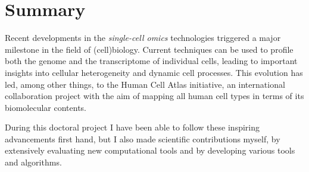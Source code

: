 
\newpage{\thispagestyle{empty}\cleardoublepage}

\newpage{\thispagestyle{empty}\cleardoublepage}
\tableofcontents 


\newpage{\thispagestyle{empty}\cleardoublepage}


\makenomenclature
\printnomenclature






\chapter*{Summary}
\vspace{-2em}

Recent developments in the \textit{single-cell omics} technologies triggered a major milestone in the field of (cell)biology. Current techniques can be used to profile both the genome and the transcriptome of individual cells, leading to important insights into cellular heterogeneity and dynamic cell processes. This evolution has led, among other things, to the Human Cell Atlas initiative, an international collaboration project with the aim of mapping all human cell types in terms of its biomolecular contents.

During this doctoral project I have been able to follow these inspiring advancements first hand, but I also made scientific contributions myself, by extensively evaluating new computational tools and by developing various tools and algorithms.

